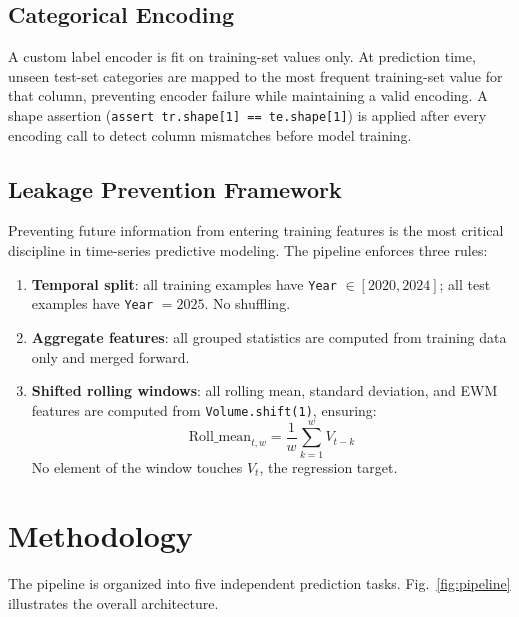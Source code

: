 \documentclass[conference]{IEEEtran}
\begin{document}
\subsection{Categorical Encoding}

A custom label encoder is fit on training-set values only. At prediction time, unseen test-set categories are mapped to the most frequent training-set value for that column, preventing encoder failure while maintaining a valid encoding. A shape assertion (\texttt{assert tr.shape[1] == te.shape[1]}) is applied after every encoding call to detect column mismatches before model training.

\subsection{Leakage Prevention Framework}

Preventing future information from entering training features is the most critical discipline in time-series predictive modeling. The pipeline enforces three rules:
\begin{enumerate}
  \item \textbf{Temporal split}: all training examples have \texttt{Year} $\in [2020, 2024]$; all test examples have \texttt{Year} $= 2025$. No shuffling.
  \item \textbf{Aggregate features}: all grouped statistics are computed from training data only and merged forward.
  \item \textbf{Shifted rolling windows}: all rolling mean, standard deviation, and EWM features are computed from \texttt{Volume.shift(1)}, ensuring:
  \begin{equation}
    \text{Roll\_mean}_{t,w} = \frac{1}{w}\sum_{k=1}^{w} V_{t-k}
  \end{equation}
  No element of the window touches $V_t$, the regression target.
\end{enumerate}

\section{Methodology}
\label{sec:method}

The pipeline is organized into five independent prediction tasks. Fig.~\ref{fig:pipeline} illustrates the overall architecture.
\end{document}
